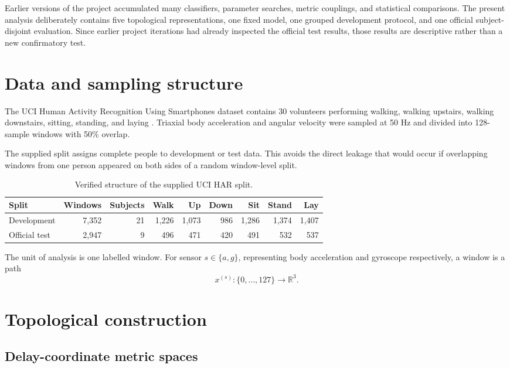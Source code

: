 \documentclass[11pt,a4paper]{article}
\begin{document}
Earlier versions of the project accumulated many classifiers, parameter searches, metric couplings, and statistical comparisons. The present analysis deliberately contains five topological representations, one fixed model, one grouped development protocol, and one official subject-disjoint evaluation. Since earlier project iterations had already inspected the official test results, those results are descriptive rather than a new confirmatory test.

\section{Data and sampling structure}

The UCI Human Activity Recognition Using Smartphones dataset contains 30 volunteers performing walking, walking upstairs, walking downstairs, sitting, standing, and laying \cite{uci-paper}. Triaxial body acceleration and angular velocity were sampled at 50 Hz and divided into 128-sample windows with 50\% overlap.

The supplied split assigns complete people to development or test data. This avoids the direct leakage that would occur if overlapping windows from one person appeared on both sides of a random window-level split.

\begin{table}[H]
\centering
\caption{Verified structure of the supplied UCI HAR split.}
\label{tab:data}
\begin{tabular}{lrrrrrrrr}
\toprule
Split & Windows & Subjects & Walk & Up & Down & Sit & Stand & Lay \\
\midrule
Development & 7,352 & 21 & 1,226 & 1,073 & 986 & 1,286 & 1,374 & 1,407 \\
Official test & 2,947 & 9 & 496 & 471 & 420 & 491 & 532 & 537 \\
\bottomrule
\end{tabular}
\end{table}

The unit of analysis is one labelled window. For sensor $s\in\{a,g\}$, representing body acceleration and gyroscope respectively, a window is a path
\[
x^{(s)}:\{0,\ldots,127\}\longrightarrow\mathbb R^3.
\]

\section{Topological construction}

\subsection{Delay-coordinate metric spaces}
\end{document}
